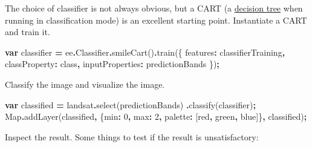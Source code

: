 \documentclass[
]{article}
\newenvironment{Shaded}{\begin{snugshade}}{\end{snugshade}}
\newcommand{\AttributeTok}[1]{\textcolor[rgb]{0.77,0.63,0.00}{#1}}
\newcommand{\BuiltInTok}[1]{#1}
\newcommand{\DataTypeTok}[1]{\textcolor[rgb]{0.13,0.29,0.53}{#1}}
\newcommand{\DecValTok}[1]{\textcolor[rgb]{0.00,0.00,0.81}{#1}}
\newcommand{\FunctionTok}[1]{\textcolor[rgb]{0.00,0.00,0.00}{#1}}
\newcommand{\KeywordTok}[1]{\textcolor[rgb]{0.13,0.29,0.53}{\textbf{#1}}}
\newcommand{\NormalTok}[1]{#1}
\newcommand{\OperatorTok}[1]{\textcolor[rgb]{0.81,0.36,0.00}{\textbf{#1}}}
\newcommand{\StringTok}[1]{\textcolor[rgb]{0.31,0.60,0.02}{#1}}
\begin{document}
The choice of classifier is not always obvious, but a CART (a \href{https://en.wikipedia.org/wiki/Decision_tree_learning}{decision tree} when running in classification mode) is an excellent starting point. Instantiate a CART and train it.

\begin{Shaded}
\begin{Highlighting}[]
\KeywordTok{var}\NormalTok{ classifier }\OperatorTok{=}\NormalTok{ ee}\OperatorTok{.}\AttributeTok{Classifier}\OperatorTok{.}\FunctionTok{smileCart}\NormalTok{()}\OperatorTok{.}\FunctionTok{train}\NormalTok{(\{}
 \DataTypeTok{features}\OperatorTok{:}\NormalTok{ classifierTraining}\OperatorTok{,} 
 \DataTypeTok{classProperty}\OperatorTok{:} \StringTok{\textquotesingle{}class\textquotesingle{}}\OperatorTok{,} 
 \DataTypeTok{inputProperties}\OperatorTok{:}\NormalTok{ predictionBands}
\NormalTok{\})}\OperatorTok{;}
\end{Highlighting}
\end{Shaded}

Classify the image and visualize the image.

\begin{Shaded}
\begin{Highlighting}[]
\KeywordTok{var}\NormalTok{ classified }\OperatorTok{=}\NormalTok{ landsat}\OperatorTok{.}\FunctionTok{select}\NormalTok{(predictionBands)}
                \OperatorTok{.}\FunctionTok{classify}\NormalTok{(classifier)}\OperatorTok{;}
\BuiltInTok{Map}\OperatorTok{.}\FunctionTok{addLayer}\NormalTok{(classified}\OperatorTok{,} 
\NormalTok{             \{}\DataTypeTok{min}\OperatorTok{:} \DecValTok{0}\OperatorTok{,} \DataTypeTok{max}\OperatorTok{:} \DecValTok{2}\OperatorTok{,} 
              \DataTypeTok{palette}\OperatorTok{:}\NormalTok{ [}\StringTok{\textquotesingle{}red\textquotesingle{}}\OperatorTok{,} \StringTok{\textquotesingle{}green\textquotesingle{}}\OperatorTok{,} \StringTok{\textquotesingle{}blue\textquotesingle{}}\NormalTok{]\}}\OperatorTok{,} 
             \StringTok{\textquotesingle{}classified\textquotesingle{}}\NormalTok{)}\OperatorTok{;}
\end{Highlighting}
\end{Shaded}

Inspect the result. Some things to test if the result is unsatisfactory:
\end{document}
